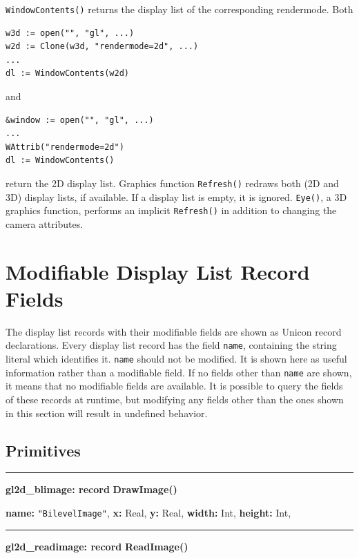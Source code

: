 \documentclass[letterpaper,12pt]{article}
\begin{document}
\noindent
\texttt{WindowContents()} returns the display list of the corresponding
rendermode. Both

\begin{verbatim}
w3d := open("", "gl", ...)
w2d := Clone(w3d, "rendermode=2d", ...)
...
dl := WindowContents(w2d)
\end{verbatim}

\noindent and

\begin{verbatim}
&window := open("", "gl", ...)
...
WAttrib("rendermode=2d")
dl := WindowContents()
\end{verbatim}

\noindent return the 2D display list. 
Graphics function \texttt{Refresh()} redraws both (2D and 3D) display lists,
if available. If a display list is empty, it is ignored. \texttt{Eye()},
a 3D graphics function, performs an implicit \texttt{Refresh()} in addition to 
changing the camera attributes.

\newpage
\section{Modifiable Display List Record Fields}

The display list records with their modifiable fields are shown as Unicon
record declarations. 
Every display list record has the field \texttt{name}, containing the string
literal which identifies it. \texttt{name} should not be modified.
It is shown here as useful information rather than a modifiable
field. If no fields other than \texttt{name} are shown, it means that no 
modifiable
fields are available. It is possible to query the fields of these records at
runtime, but modifying any fields other than the ones shown in this section
will result in undefined behavior.

\subsection{Primitives}

\bigskip\hrule\vspace{0.1cm}
\noindent
{\bf gl2d\_blimage: record} \hfill {\bf DrawImage()}

{\bf name:} \texttt{"BilevelImage"},\newline\indent
{\bf x:} Real,
{\bf y:} Real,
{\bf width:} Int,
{\bf height:} Int,

\bigskip\hrule\vspace{0.1cm}
\noindent
{\bf gl2d\_readimage: record} \hfill {\bf ReadImage()} 
\end{document}
